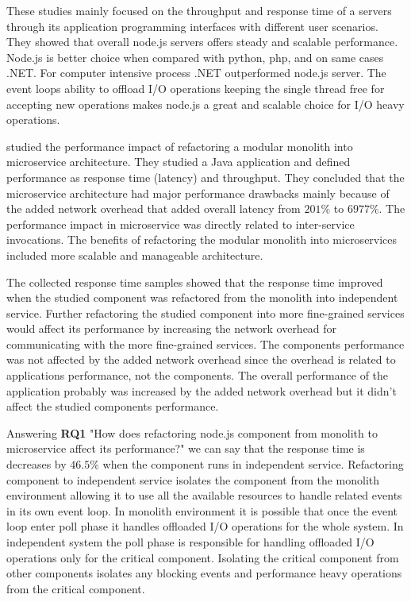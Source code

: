 These studies mainly focused on the throughput and response time of a servers through its application programming interfaces with different user scenarios.
They showed that overall node.js servers offers steady and scalable performance.
Node.js is better choice when compared with python, php, and on same cases .NET.
For computer intensive process .NET outperformed node.js server.
The event loops ability to offload I/O operations keeping the single thread free for accepting new operations makes node.js a great and scalable choice for I/O heavy operations.

\cite{SelakovicPerformanceIssues} studied the performance impact of refactoring a modular monolith into microservice architecture.
They studied a Java application and defined performance as response time (latency) and throughput.
They concluded that the microservice architecture had major performance drawbacks mainly because of the added network overhead that added overall latency from $201\%$ to $6977\%$.
The performance impact in microservice was directly related to inter-service invocations.
The benefits of refactoring the modular monolith into microservices included more scalable and manageable architecture.

The collected response time samples showed that the response time improved when the studied component was refactored from the monolith into independent service.
Further refactoring the studied component into more fine-grained services would affect its performance by increasing the network overhead for communicating with the more fine-grained services.
The components performance was not affected by the added network overhead since the overhead is related to applications performance, not the components.
The overall performance of the application probably was increased by the added network overhead but it didn't affect the studied components performance.

Answering \textbf{RQ1} "How does refactoring node.js component from monolith to microservice affect its performance?" we can say that the response time is decreases by $46.5\%$ when the component runs in independent service.
Refactoring component to independent service isolates the component from the monolith environment allowing it to use all the available resources to handle related events in its own event loop.
In monolith environment it is possible that once the event loop enter poll phase it handles offloaded I/O operations for the whole system.
In independent system the poll phase is responsible for handling offloaded I/O operations only for the critical component.
Isolating the critical component from other components isolates any blocking events and performance heavy operations from the critical component.

